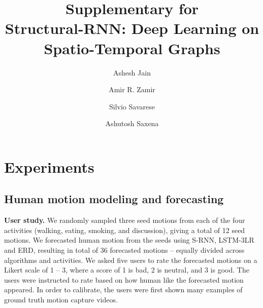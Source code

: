 \documentclass[10pt,twocolumn,letterpaper]{article}
\begin{document}
\title{ Supplementary for\\  Structural-RNN: Deep Learning on Spatio-Temporal Graphs}
\author[1,2]{Ashesh Jain}
\author[2]{Amir R. Zamir}
\author[2]{Silvio Savarese}
\author[3]{Ashutosh Saxena}

\iffalse
\title{ Supplementary for\\ Structural-RNN: Deep Learning on Spatio-Temporal Graphs}
\author{First Author\\
Institution1\\
Institution1 address\\
{\tt\small firstauthor@i1.org}
\and
Second Author\\
Institution2\\
First line of institution2 address\\
{\tt\small secondauthor@i2.org}
}
\fi

\maketitle






\setcounter{section}{3}
\section{Experiments}
\subsection{Human motion modeling and forecasting}
\noindent \textbf{User study.}  We randomly sampled three seed motions from each of the four activities (walking, eating, smoking, and discussion), giving a total of 12 seed motions. We forecasted human motion from the seeds using S-RNN, LSTM-3LR and ERD, resulting in total of 36 forecasted motions -- equally divided across algorithms and activities. We asked five users to rate the forecasted motions on a Likert scale of 1 -- 3, where a score of 1 is bad, 2 is neutral, and 3 is good. The users were instructed to rate  based on how human like the forecasted motion appeared. In order to calibrate, the users were first shown many examples of ground truth motion capture videos.
\end{document}
